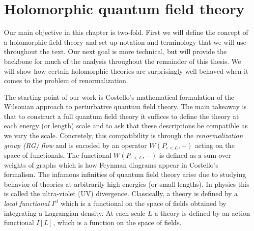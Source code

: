 %
%
%
%
%
%
%
%
%

\chapter{Holomorphic quantum field theory} \label{chap: holtheory}

Our main objective in this chapter is two-fold. 
First we will define the concept of a holomorphic field theory and set up notation and terminology that we will use throughout the text. 
Our next goal is more technical, but will provide the backbone for much of the analysis throughout the remainder of this thesis.
We will show how certain holomorphic theories are surprisingly well-behaved when it comes to the problem of renormalization. 

The starting point of our work is Costello's \cite{CostelloRenormalization} mathematical formulation of the Wilsonian approach to perturbative quantum field theory.
The main takeaway is that to construct a full quantum field theory it suffices to define the theory at each energy (or length) scale and to ask that these descriptions be compatible as we vary the scale.
Concretely, this compatibility is through the {\em renormalization group (RG) flow} and is encoded by an operator $W(P_{\epsilon < L}, -)$ acting on the space of functionals. 
The functional $W(P_{\epsilon < L},-)$ is defined as a sum over weights of graphs which is how Feynman diagrams appear in Costello's formalism.
The infamous infinities of quantum field theory arise due to studying behavior of theories at arbitrarily high energies (or small lengths). 
In physics this is called the ultra-violet (UV) divergence. 
Classically, a theory is defined by a {\em local functional} $I^{cl}$ which is a functional on the space of fields obtained by integrating a Lagrangian density.
At each scale $L$ a theory is defined by an action functional $I[L]$, which is a function on the space of fields. 

